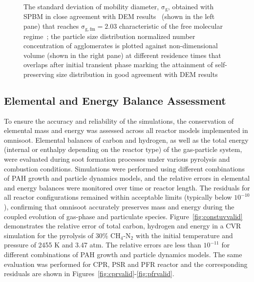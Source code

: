 \begin{figure}[H]
\begin{subfigure}[t]{0.4\textwidth}
	\end{subfigure}
	\caption{The standard deviation of mobility diameter, $\mathrm{\sigma_g}$, obtained with SPBM in close agreement with DEM results~\citep{kholghy2021surface} (shown in the left pane) that reaches $\mathrm{\sigma_{g,fm}=2.03}$ characteristic of the free molecular regime~\citep{vemury1995self}; the particle size distribution normalized number concentration of agglomerates is plotted against non-dimensional volume (shown in the right pane) at different residence times that overlaps after initial transient phase marking the attainment of self-preserving size distribution in good agreement with DEM results~\citep{goudeli2015coagulation}}
	\label{fig:coagvalid_sigmapsd} 
\end{figure}

\subsection{Elemental and Energy Balance Assessment}

\noindent To ensure the accuracy and reliability of the simulations, the conservation of elemental mass and energy was assessed across all reactor models implemented in {omnisoot}. Elemental balances of carbon and hydrogen, as well as the total energy (internal or enthalpy depending on the reactor type) of the gas-particle system, were evaluated during soot formation processes under various pyrolysis and combustion conditions.
Simulations were performed using different combinations of PAH growth and particle dynamics models, and the relative errors in elemental and energy balances were monitored over time or reactor length. The residuals for all reactor configurations remained within acceptable limits (typically below $10^{-10}$), confirming that {omnisoot} accurately preserves mass and energy during the coupled evolution of gas-phase and particulate species. Figure~\ref{fig:constuvvalid} demonstrates the relative error of total carbon, hydrogen and energy in a CVR simulation for the pyrolysis of 30\% $\mathrm{CH_4}$-$\mathrm{N_2}$ with the initial temperature and pressure of 2455 K and 3.47 atm. The relative errors are less than $10^{-11}$ for different combinations of PAH growth and particle dynamics models. The same evaluation was performed for CPR, PSR and PFR reactor and the corresponding residuals are shown in Figures~\ref{fig:cprvalid}-\ref{fig:pfrvalid}.


